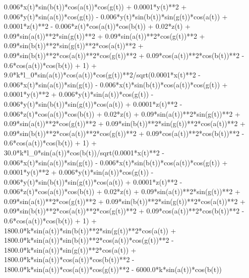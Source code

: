 0.006*x(t)*sin(b(t))*cos(a(t))*cos(g(t)) + 0.0001*y(t)**2 + 0.006*y(t)*sin(a(t))*cos(g(t)) - 0.006*y(t)*sin(b(t))*sin(g(t))*cos(a(t)) + 0.0001*z(t)**2 - 0.006*z(t)*cos(a(t))*cos(b(t)) + 0.02*z(t) + 0.09*sin(a(t))**2*sin(g(t))**2 + 0.09*sin(a(t))**2*cos(g(t))**2 + 0.09*sin(b(t))**2*sin(g(t))**2*cos(a(t))**2 + 0.09*sin(b(t))**2*cos(a(t))**2*cos(g(t))**2 + 0.09*cos(a(t))**2*cos(b(t))**2 - 0.6*cos(a(t))*cos(b(t)) + 1) + 9.0*k*l_0*sin(a(t))*cos(a(t))*cos(g(t))**2/sqrt(0.0001*x(t)**2 - 0.006*x(t)*sin(a(t))*sin(g(t)) - 0.006*x(t)*sin(b(t))*cos(a(t))*cos(g(t)) + 0.0001*y(t)**2 + 0.006*y(t)*sin(a(t))*cos(g(t)) - 0.006*y(t)*sin(b(t))*sin(g(t))*cos(a(t)) + 0.0001*z(t)**2 - 0.006*z(t)*cos(a(t))*cos(b(t)) + 0.02*z(t) + 0.09*sin(a(t))**2*sin(g(t))**2 + 0.09*sin(a(t))**2*cos(g(t))**2 + 0.09*sin(b(t))**2*sin(g(t))**2*cos(a(t))**2 + 0.09*sin(b(t))**2*cos(a(t))**2*cos(g(t))**2 + 0.09*cos(a(t))**2*cos(b(t))**2 - 0.6*cos(a(t))*cos(b(t)) + 1) + 30.0*k*l_0*sin(a(t))*cos(b(t))/sqrt(0.0001*x(t)**2 - 0.006*x(t)*sin(a(t))*sin(g(t)) - 0.006*x(t)*sin(b(t))*cos(a(t))*cos(g(t)) + 0.0001*y(t)**2 + 0.006*y(t)*sin(a(t))*cos(g(t)) - 0.006*y(t)*sin(b(t))*sin(g(t))*cos(a(t)) + 0.0001*z(t)**2 - 0.006*z(t)*cos(a(t))*cos(b(t)) + 0.02*z(t) + 0.09*sin(a(t))**2*sin(g(t))**2 + 0.09*sin(a(t))**2*cos(g(t))**2 + 0.09*sin(b(t))**2*sin(g(t))**2*cos(a(t))**2 + 0.09*sin(b(t))**2*cos(a(t))**2*cos(g(t))**2 + 0.09*cos(a(t))**2*cos(b(t))**2 - 0.6*cos(a(t))*cos(b(t)) + 1) + 1800.0*k*sin(a(t))*sin(b(t))**2*sin(g(t))**2*cos(a(t)) + 1800.0*k*sin(a(t))*sin(b(t))**2*cos(a(t))*cos(g(t))**2 - 1800.0*k*sin(a(t))*sin(g(t))**2*cos(a(t)) + 1800.0*k*sin(a(t))*cos(a(t))*cos(b(t))**2 - 1800.0*k*sin(a(t))*cos(a(t))*cos(g(t))**2 - 6000.0*k*sin(a(t))*cos(b(t))
